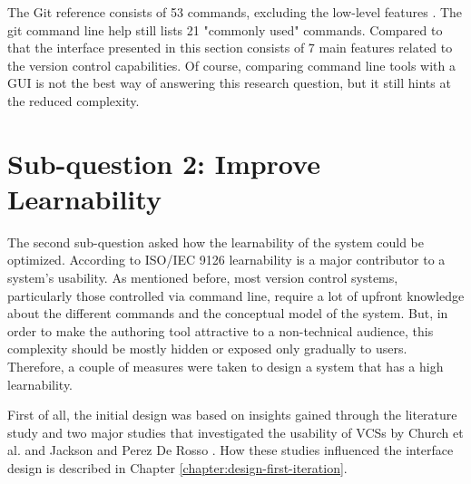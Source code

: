 
The Git reference consists of 53 commands, excluding the low-level features \cite{_gitref_????}. The git command line help still lists 21 "commonly used" commands. Compared to that the interface presented in this section consists of 7 main features related to the version control capabilities. Of course, comparing command line tools with a GUI is not the best way of answering this research question, but it still hints at the reduced complexity.










\section{Sub-question 2: Improve Learnability}
The second sub-question asked how the learnability of the system could be optimized. According to ISO/IEC 9126 \cite{_iso/iec_2001} learnability is a major contributor to a system's usability. As mentioned before, most version control systems, particularly those controlled via command line, require a lot of upfront knowledge about the different commands and  the conceptual model of the system. But, in order to make the authoring tool attractive to a non-technical audience, this complexity should be mostly hidden or exposed only gradually to users. Therefore, a couple of measures were taken to design a system that has a high learnability.

First of all, the initial design was based on insights gained through the literature study and two major studies that investigated the usability of VCSs by Church et al. \cite{church_case_2014} and Jackson and Perez De Rosso \cite{perez_de_rosso_whats_2013}. How these studies influenced the interface design is described in Chapter \ref{chapter:design-first-iteration}.

